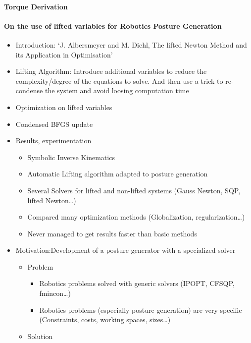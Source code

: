 \paragraph{Torque Derivation}

\paragraph{On the use of lifted variables for Robotics Posture Generation}
\begin{itemize}
  \item {Introduction: `J. Albersmeyer and M. Diehl, The lifted Newton Method and its Application in Optimisation'}
  \item {Lifting Algorithm: Introduce additional variables to reduce the complexity/degree of the equations to solve. And then use a trick to re-condense the system and avoid loosing computation time}
  \item {Optimization on lifted variables}
  \item {Condensed BFGS update}
  \item {Results, experimentation}
  \begin{itemize}
    \item Symbolic Inverse Kinematics
    \item Automatic Lifting algorithm adapted to posture generation
    \item Several Solvers for lifted and non-lifted systems (Gauss Newton, SQP, lifted Newton\ldots)
    \item Compared many optimization methods (Globalization, regularization\ldots)
    \item Never managed to get results faster than basic methods
  \end{itemize}
  \item{Motivation:Development of a posture generator with a specialized solver}
    \begin{itemize}
      \item Problem
        \begin{itemize}
          \item Robotics problems solved with generic solvers (IPOPT, CFSQP, fmincon\ldots)
          \item Robotics problems (especially posture generation) are very specific (Constraints, costs, working spaces, sizes\ldots)
        \end{itemize}
      \item Solution
        \begin{itemize}

\end{itemize}
\end{itemize}
\end{itemize}
